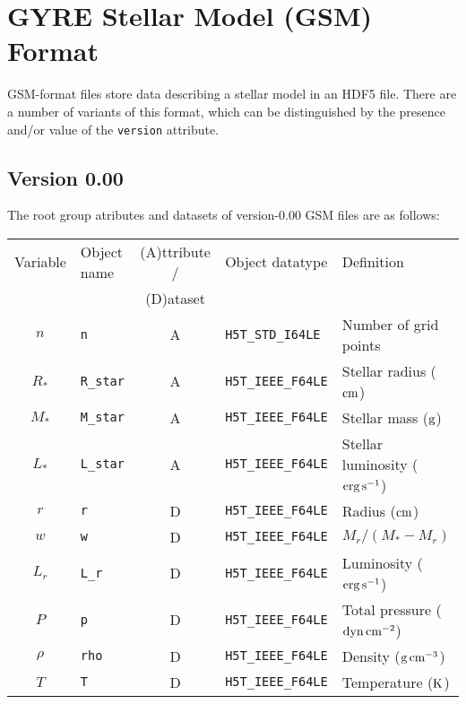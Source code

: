 \documentclass{article}
\newcommand{\Rstar}{\ensuremath{R_{\ast}}}
\newcommand{\Mstar}{\ensuremath{M_{\ast}}}
\newcommand{\Lstar}{\ensuremath{L_{\ast}}}
\newcommand{\cm}{\ensuremath{{\rm cm}}}
\newcommand{\gram}{\ensuremath{{\rm g}}}
\newcommand{\second}{\ensuremath{{\rm s}}}
\newcommand{\dyne}{\ensuremath{{\rm dyn}}}
\newcommand{\erg}{\ensuremath{{\rm erg}}}
\newcommand{\kelvin}{\ensuremath{{\rm K}}}
\begin{document}
\section*{GYRE Stellar Model (GSM) Format}

GSM-format files store data describing a stellar model in an HDF5
file. There are a number of variants of this format, which can be
distinguished by the presence and/or value of the \texttt{version}
attribute.

\subsection*{Version 0.00}

The root group atributes and datasets of version-0.00 GSM files are as follows:

\begin{table}[h!]
\begin{tabular}{|c|l|c|l|l|} \hline
Variable & Object name & (A)ttribute / & Object datatype & Definition \\
         &             & (D)ataset     &                 &            \\ \hline
$n$               & \texttt{n}            & A &\texttt{H5T\_STD\_I64LE}  & Number of grid points \\ 
\Rstar            & \texttt{R\_star}      & A & \texttt{H5T\_IEEE\_F64LE} & Stellar radius ($\cm$) \\
\Mstar            & \texttt{M\_star}      & A & \texttt{H5T\_IEEE\_F64LE} & Stellar mass ($\gram$) \\
\Lstar            & \texttt{L\_star}      & A & \texttt{H5T\_IEEE\_F64LE} & Stellar luminosity ($\erg\,\second^{-1}$) \\
$r$               & \texttt{r}            & D & \texttt{H5T\_IEEE\_F64LE} & Radius ($\cm$) \\
$w$               & \texttt{w}            & D & \texttt{H5T\_IEEE\_F64LE} & $M_{r}/(\Mstar-M_{r})$ \\
$L_{r}$           & \texttt{L\_r}         & D & \texttt{H5T\_IEEE\_F64LE} & Luminosity ($\erg\,\second^{-1}$) \\
$P$               & \texttt{p}            & D & \texttt{H5T\_IEEE\_F64LE} & Total pressure ($\dyne\,\cm^{-2}$) \\
$\rho$            & \texttt{rho}          & D & \texttt{H5T\_IEEE\_F64LE} & Density ($\gram\,\cm^{-3}$) \\
$T$               & \texttt{T}            & D & \texttt{H5T\_IEEE\_F64LE} & Temperature ($\kelvin$) \\

\end{tabular}
\end{table}
\end{document}
